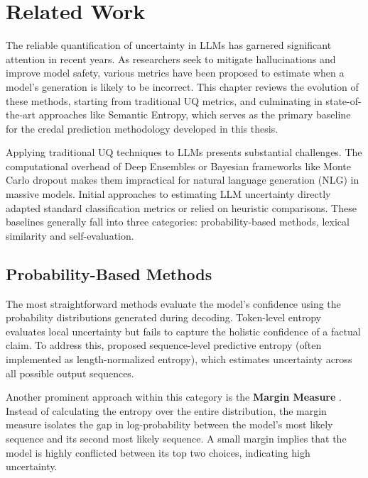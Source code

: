 %
\chapter{Related Work}
\label{sec:related_work}
The reliable quantification of uncertainty in LLMs has garnered 
significant attention in recent years. As researchers seek to mitigate
hallucinations and improve model safety, various metrics have been 
proposed to estimate when a model's generation is likely to be 
incorrect. This chapter reviews the evolution of these methods,   
starting from traditional UQ metrics, and 
culminating in state-of-the-art approaches like Semantic Entropy,
which serves as the primary baseline for the credal prediction
methodology developed in this thesis.

Applying traditional UQ techniques 
to LLMs presents substantial challenges.
The computational overhead of Deep Ensembles 
\parencite{lakshminarayanan2017simplescalablepredictiveuncertainty}
or Bayesian frameworks like Monte Carlo dropout 
\parencite{gal2016dropoutbayesianapproximationrepresenting}
makes them impractical for natural language generation (NLG) in 
massive models. 
Initial approaches to estimating LLM uncertainty directly adapted
standard classification metrics or relied on heuristic comparisons.
These baselines generally fall into three categories: 
probability-based methods, lexical similarity and self-evaluation.

\section{Probability-Based Methods}
\label{sec:related_work:predictive_entropy_methods}
The most straightforward methods evaluate the model's confidence 
using the probability distributions generated during decoding. 
Token-level entropy evaluates local uncertainty but fails to capture
the holistic confidence of a factual claim. To address this,  
\textcite{malinin2021uncertaintyestimationautoregressivestructured}
proposed sequence-level predictive entropy (often implemented as 
length-normalized entropy), which estimates uncertainty across all
possible output sequences. 

Another prominent approach within this category is the 
\textbf{Margin Measure} \parencite{lin-etal-2022-towards}.
Instead of calculating the entropy over the entire distribution,
the margin measure isolates the gap in log-probability
between the model's most likely sequence and its second most  
likely sequence. A small margin implies that the model is highly
conflicted between its top two choices, indicating high 
uncertainty.

